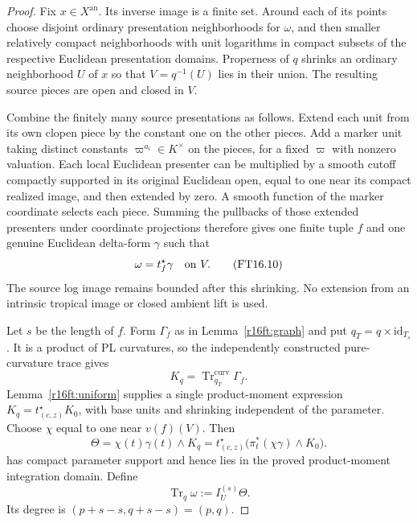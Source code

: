 \begin{proof}
Fix $x\in X^{\mathrm{an}}$. Its inverse image is a finite set. Around
each of its points choose disjoint ordinary presentation neighborhoods
for $\omega$, and then smaller relatively compact neighborhoods with
unit logarithms in compact subsets of the respective Euclidean
presentation domains. Properness of $q$ shrinks an ordinary neighborhood
$U$ of $x$ so that $V=q^{-1}(U)$ lies in their union. The resulting
source pieces are open and closed in $V$.

Combine the finitely many source presentations as follows. Extend each
unit from its own clopen piece by the constant one on the other pieces.
Add a marker unit taking distinct constants $\varpi^{a_i}\in K^\times$
on the pieces, for a fixed $\varpi$ with nonzero valuation. Each local
Euclidean presenter can be multiplied by a smooth cutoff compactly
supported in its original Euclidean open, equal to one near its compact
realized image, and then extended by zero. A smooth function of the
marker coordinate selects each piece. Summing the pullbacks of those
extended presenters under coordinate projections therefore gives one
finite tuple $f$ and one genuine Euclidean delta-form $\gamma$ such that
\[
                     \omega=t_f^\star\gamma\quad\hbox{on }V.
 \tag{FT16.10}\label{r16ft:whole-fiber}
\]
The source log image remains bounded after this shrinking. No extension
from an intrinsic tropical image or closed ambient lift is used.

Let $s$ be the length of $f$. Form $\Gamma_f$ as in
Lemma~\ref{r16ft:graph} and put $q_T=q\times\mathrm{id}_{T_s}$.
It is a product of PL curvatures, so the independently constructed
pure-curvature trace gives
\[
                    K_q=\operatorname{Tr}^{\mathrm{curv}}_{q_T}\Gamma_f.
\]
Lemma~\ref{r16ft:uniform} supplies a single product-moment expression
$K_q=t_{(c,z)}^\star K_0$, with base units and shrinking independent of
the parameter. Choose $\chi$ equal to one near $v(f)(V)$. Then
\[
 \Theta=\chi(t)\gamma(t)\wedge K_q
       =t_{(c,z)}^\star\bigl(\pi_t^*(\chi\gamma)\wedge K_0\bigr).
 \tag{FT16.11}\label{r16ft:integrand}
\]
has compact parameter support and hence lies in the proved
product-moment integration domain. Define
\[
           \operatorname{Tr}_q\omega:=I^{(s)}_U\Theta.
 \tag{FT16.12}\label{r16ft:trace-construction}
\]
Its degree is $(p+s-s,q+s-s)=(p,q)$.


\end{proof}
